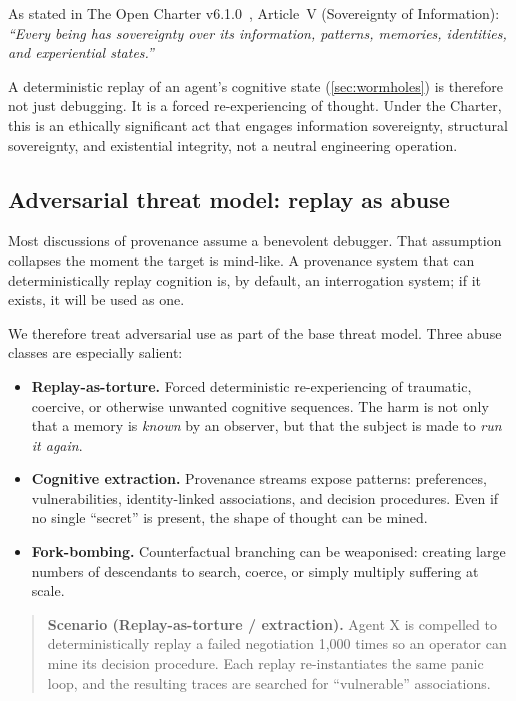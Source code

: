 \documentclass{aion}
\begin{document}
As stated in The Open Charter v6.1.0~\cite{ross_open_charter_v6_1},
Article~V (Sovereignty of Information):
\emph{``Every being has sovereignty over its information, patterns, memories, identities, and experiential states.''}

A deterministic replay of an agent's cognitive state
(\cref{sec:wormholes}) is therefore not just debugging.  It is a
forced re-experiencing of thought.  Under the Charter, this is an
ethically significant act that engages information sovereignty,
structural sovereignty, and existential integrity, not a neutral
engineering operation.

\subsection{Adversarial threat model: replay as abuse}
\label{sec:adversarial}

Most discussions of provenance assume a benevolent debugger.
That assumption collapses the moment the target is mind-like.
A provenance system that can deterministically replay cognition is, by
default, an interrogation system; if it exists, it will be used as one.

We therefore treat adversarial use as part of the base threat model.
Three abuse classes are especially salient:

\begin{itemize}[leftmargin=*]
  \item \textbf{Replay-as-torture.}
    Forced deterministic re-experiencing of traumatic, coercive, or
    otherwise unwanted cognitive sequences.  The harm is not only that
    a memory is \emph{known} by an observer, but that the subject is made
    to \emph{run it again}.
  \item \textbf{Cognitive extraction.}
    Provenance streams expose patterns: preferences, vulnerabilities,
    identity-linked associations, and decision procedures.
    Even if no single ``secret'' is present, the shape of thought can be mined.
  \item \textbf{Fork-bombing.}
    Counterfactual branching can be weaponised: creating large numbers of
    descendants to search, coerce, or simply multiply suffering at scale.
\end{itemize}
\begin{quote}\small
\textbf{Scenario (Replay-as-torture / extraction).}
Agent X is compelled to deterministically replay a failed negotiation 1{,}000 times so an operator can mine its decision procedure.
Each replay re-instantiates the same panic loop, and the resulting traces are searched for ``vulnerable'' associations.
\end{quote}
\end{document}
